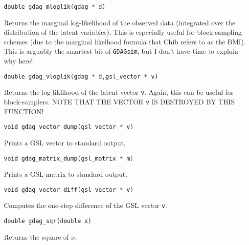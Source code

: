 \documentclass[12pt,a4paper]{article}
\newcommand{\gds}{\texttt{GDAGsim}}
\begin{document}
\begin{verbatim}
double gdag_mloglik(gdag * d)
\end{verbatim}
Returns the marginal log-likelihood of the observed data (integrated
over the distribution of the latent variables). This is especially
useful for block-sampling schemes (due to the marginal likelhood
formula that Chib refers to as the BMI). This is arguably the smartest 
bit of \gds, but I don't have time to explain why here!

\begin{verbatim}
double gdag_vloglik(gdag * d,gsl_vector * v)
\end{verbatim}
Returns the log-liklihood of the latent vector \verb$v$. Again, this
can be useful for block-samplers. NOTE THAT THE VECTOR \verb$v$ IS
DESTROYED BY THIS FUNCTION!

\begin{verbatim}
void gdag_vector_dump(gsl_vector * v)
\end{verbatim}
Prints a GSL vector to standard output.

\begin{verbatim}
void gdag_matrix_dump(gsl_matrix * m)
\end{verbatim}
Prints a GSL matrix to standard output.

\begin{verbatim}
void gdag_vector_diff(gsl_vector * v)
\end{verbatim}
Computes the one-step difference of the GSL vector \verb$v$.

\begin{verbatim}
double gdag_sqr(double x)
\end{verbatim}
Returns the square of $x$.
\end{document}
